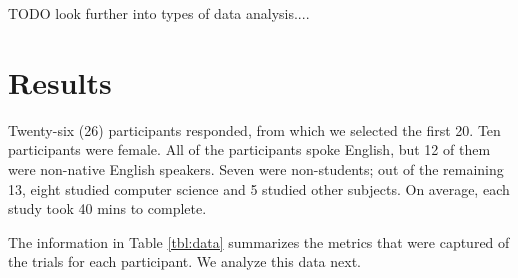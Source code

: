 \documentclass{sigchi}
\begin{document}
TODO look further into types of data analysis....


\section{Results}

Twenty-six (26) participants responded, from which we selected the first 20.  Ten participants were female.  All of the participants spoke English, but 12 of them were non-native English speakers.  Seven were non-students; out of the remaining 13, eight studied computer science and 5 studied other subjects.   On average, each study took 40 mins to complete.

The information in Table \ref{tbl:data} summarizes the metrics that were captured of the trials for each participant. We analyze this data next.
\end{document}
